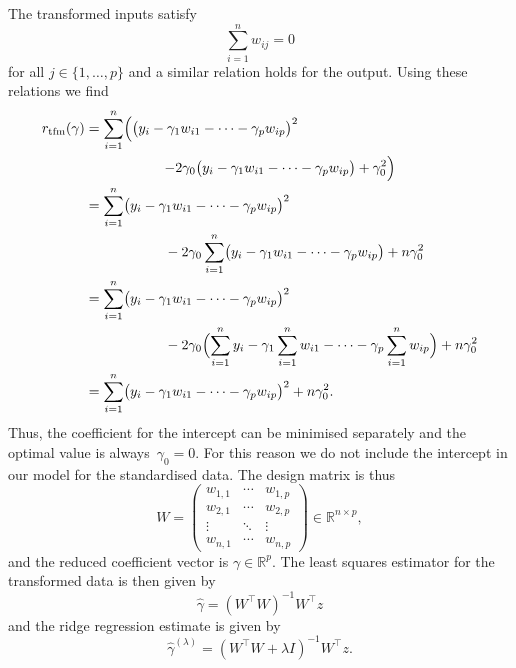 \documentclass[
  a4paper,
]{article}
\theoremstyle{definition}
\theoremstyle{definition}
\theoremstyle{definition}
\theoremstyle{definition}
\theoremstyle{remark}
\begin{document}
The transformed inputs satisfy
\begin{equation*}
  \sum_{i=1}^n w_{ij} = 0
\end{equation*}
for all \(j\in\{1, \ldots, p\}\) and a similar relation holds for the output.
Using these relations we find
\begin{align*}
  r_\mathrm{tfm}(\gamma)
  &= \sum_{i=1}^n \Bigl(
      \bigl( y_i - \gamma_1 w_{i1} - \cdots - \gamma_p w_{ip} \bigr)^2 \Bigr. \\
    &\hskip2cm \Bigl.
      - 2 \gamma_0 \bigl( y_i - \gamma_1 w_{i1} - \cdots - \gamma_p w_{ip} \bigr)
      + \gamma_0^2
    \Bigr) \\
  &= \sum_{i=1}^n
      \bigl( y_i - \gamma_1 w_{i1} - \cdots - \gamma_p w_{ip} \bigr)^2 \\
    &\hskip2cm
      - 2 \gamma_0 \sum_{i=1}^n \bigl( y_i - \gamma_1 w_{i1} - \cdots - \gamma_p w_{ip} \bigr)
      + n \gamma_0^2 \\
  &= \sum_{i=1}^n
      \bigl( y_i - \gamma_1 w_{i1} - \cdots - \gamma_p w_{ip} \bigr)^2 \\
    &\hskip2cm
      - 2 \gamma_0 \Bigl( \sum_{i=1}^n y_i - \gamma_1 \sum_{i=1}^n w_{i1} - \cdots - \gamma_p \sum_{i=1}^n w_{ip} \Bigr)
      + n \gamma_0^2 \\
  &= \sum_{i=1}^n
      \bigl( y_i - \gamma_1 w_{i1} - \cdots - \gamma_p w_{ip} \bigr)^2
      + n \gamma_0^2.
\end{align*}
Thus, the coefficient for the intercept can be minimised separately and
the optimal value is always~\(\gamma_0 = 0\). For this reason we do
not include the intercept in our model for the standardised data.
The design matrix is thus
\begin{equation*}
  W
  = \begin{pmatrix}
    w_{1,1} & \cdots & w_{1,p} \\
    w_{2,1} & \cdots & w_{2,p} \\
    \vdots & \ddots & \vdots \\
    w_{n,1} & \cdots & w_{n,p}
  \end{pmatrix} \in \mathbb{R}^{n\times p},
\end{equation*}
and the reduced coefficient vector is \(\gamma \in \mathbb{R}^p\).
The least squares estimator for the transformed data is then given by
\begin{equation*}
  \hat\gamma
  = (W^\top W)^{-1} W^\top z
\end{equation*}
and the ridge regression estimate is given by
\begin{equation*}
  \hat\gamma^{(\lambda)}
  = (W^\top W + \lambda I)^{-1} W^\top z.
\end{equation*}
\end{document}
